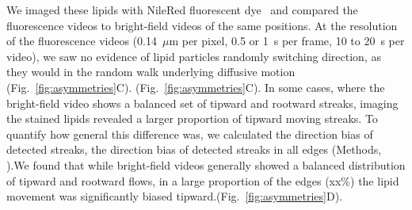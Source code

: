 We imaged these lipids with NileRed fluorescent dye~\cite{bago_tracking_2002} and compared the fluorescence videos to bright-field videos of the same positions. At the resolution of the fluorescence videos (0.14~$\mu$m per pixel, 0.5 or 1~s per frame, 10 to 20~s per video), we saw no evidence of lipid particles randomly switching direction, as they would in the random walk underlying diffusive motion (Fig.~\ref{fig:asymmetries}C). (Fig.~\ref{fig:asymmetries}C). In some cases, where the bright-field video shows a balanced set of tipward and rootward streaks, imaging the stained lipids revealed a larger proportion of tipward moving streaks. 
To quantify how general this difference was, we calculated the direction bias of detected streaks, the direction bias of detected streaks in all edges (Methods, ).We found that while bright-field videos generally showed a balanced distribution of tipward and rootward flows, in a large proportion of the edges (xx\%) the lipid movement was significantly biased tipward.(Fig.~\ref{fig:asymmetries}D). 

